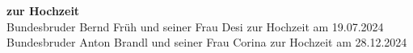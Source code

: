 {\begin{multicols}{2}



\textbf{zur Hochzeit}\\
Bundesbruder Bernd Früh und seiner Frau Desi zur Hochzeit am 19.07.2024
\vspace{1.5mm}
\newline
Bundesbruder Anton Brandl und seiner Frau \newline Corina zur Hochzeit am 28.12.2024


\vspace{1.5mm}







%



\vspace{1.5mm}








\end{multicols}


\vspace{1cm}

\begin{multicols}{2}



\end{multicols}}
